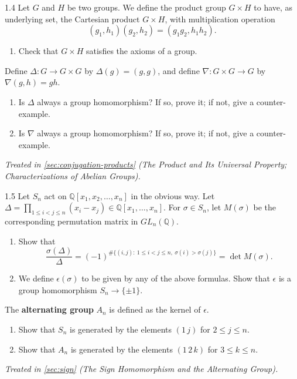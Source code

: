 \documentclass[11pt]{report}
\begin{document}
\begin{hwbox}{1.4}\label{hw:1.4}
Let $G$ and $H$ be two groups. We define the product group $G \times H$ to have, as underlying set, the Cartesian product $G \times H$, with multiplication operation
\[ (g_1, h_1)(g_2, h_2) = (g_1 g_2, h_1 h_2). \]
\begin{enumerate}
    \item Check that $G \times H$ satisfies the axioms of a group.
\end{enumerate}
Define $\Delta: G \to G \times G$ by $\Delta(g) = (g, g)$, and define $\nabla: G \times G \to G$ by $\nabla(g, h) = gh$.
\begin{enumerate}[resume]
    \item Is $\Delta$ always a group homomorphism? If so, prove it; if not, give a counter-example.
    \item Is $\nabla$ always a group homomorphism? If so, prove it; if not, give a counter-example.
\end{enumerate}
\end{hwbox}
\textit{Treated in \ref{sec:conjugation-products} (The Product and Its Universal Property; Characterizations of Abelian Groups).}

\begin{hwbox}{1.5}\label{hw:1.5}
Let $S_n$ act on $\mathbb{Q}[x_1, x_2, \ldots, x_n]$ in the obvious way. Let $\Delta = \prod_{1 \leq i < j \leq n} (x_i - x_j) \in \mathbb{Q}[x_1, \ldots, x_n]$. For $\sigma \in S_n$, let $M(\sigma)$ be the corresponding permutation matrix in $GL_n(\mathbb{Q})$.
\begin{enumerate}
    \item Show that
    \[ \frac{\sigma(\Delta)}{\Delta} = (-1)^{\#\{(i,j) :\ 1 \leq i < j \leq n,\ \sigma(i) > \sigma(j)\}} = \det M(\sigma). \]
    \item We define $\epsilon(\sigma)$ to be given by any of the above formulas. Show that $\epsilon$ is a group homomorphism $S_n \to \{\pm 1\}$.
\end{enumerate}
The \textbf{alternating group} $A_n$ is defined as the kernel of $\epsilon$.
\begin{enumerate}[resume]
    \item Show that $S_n$ is generated by the elements $(1\,j)$ for $2 \leq j \leq n$.
    \item Show that $A_n$ is generated by the elements $(1\,2\,k)$ for $3 \leq k \leq n$.
\end{enumerate}
\end{hwbox}
\textit{Treated in \ref{sec:sign} (The Sign Homomorphism and the Alternating Group).}
\end{document}
